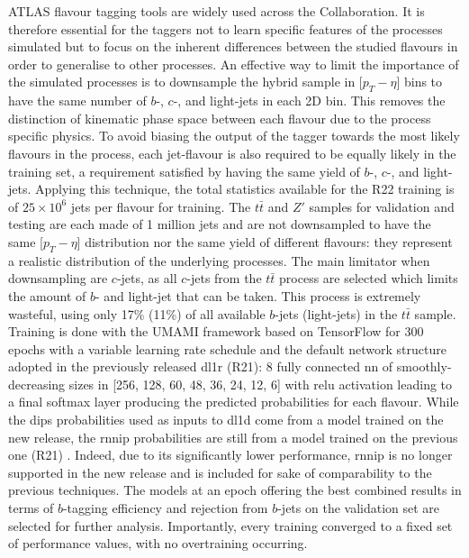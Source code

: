 ATLAS flavour tagging tools are widely used across the Collaboration. It is therefore essential for the taggers not to learn specific features of the processes simulated but to focus on the inherent differences between the studied flavours in order to generalise to other processes. An effective way to limit the importance of the simulated processes is to downsample the hybrid sample in [$p_T - \eta$] bins to have the same number of $b$-, $c$-, and light-jets in each 2D bin. This removes the distinction of kinematic phase space between each flavour due to the process specific physics. To avoid biasing the output of the tagger towards the most likely flavours in the process, each jet-flavour is also required to be equally likely in the training set, a requirement satisfied by having the same yield of $b$-, $c$-, and light-jets. Applying this technique, the total statistics available for the R22 training is of $25 \times 10^{6}$ jets per flavour for training. The $t\bar{t}$ and $Z'$ samples for validation and testing are each made of 1 million jets and are not downsampled to have the same [$p_T - \eta$] distribution nor the same yield of different flavours: they represent a realistic distribution of the underlying processes. The main limitator when downsampling are $c$-jets, as all $c$-jets from the $t\bar{t}$ process are selected which limits the amount of $b$- and light-jet that can be taken. This process is extremely wasteful, using only 17\% (11\%) of all available $b$-jets (light-jets) in the $t\bar{t}$ sample.\\

Training is done with the \uppercase{Umami} framework \cite{UmamiCite} based on TensorFlow \cite{tensorflow2015-whitepaper} for 300 epochs with a variable learning rate schedule and the default network structure adopted in the previously released \gls{dl1r} (R21): 8 fully connected \gls{nn} of smoothly-decreasing sizes in [256, 128, 60, 48, 36, 24, 12, 6] with \gls{relu} activation leading to a final softmax layer producing the predicted probabilities for each flavour. While the \gls{dips} probabilities used as inputs to \gls{dl1d} come from a model trained on the new release, the \gls{rnnip} probabilities are still from a model trained on the previous one (R21) \cite{ATL-PHYS-PUB-2017-003, ATL-PHYS-PUB-2020-014}. Indeed, due to its significantly lower performance, \gls{rnnip} is no longer supported in the new release and is included for sake of comparability to the previous techniques. The models at an epoch offering the best combined results in terms of $b$-tagging efficiency and rejection from $b$-jets on the validation set are selected for further analysis. Importantly, every training converged to a fixed set of performance values, with no overtraining occurring.\\

